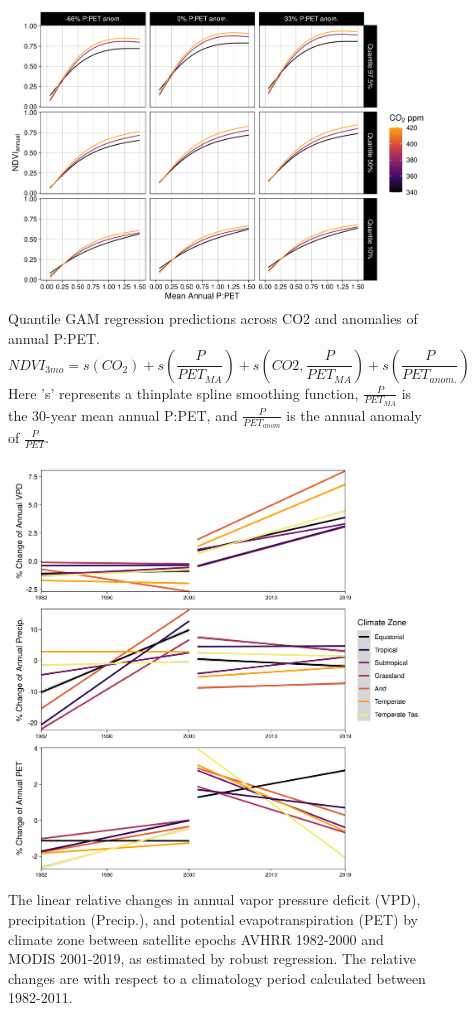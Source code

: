 \documentclass[gc, manuscript]{copernicus}
\begin{document}
\clearpage
\begin{figure}
\includegraphics[width=14cm]{../../figures/appendix-A/SM_Fig7_quantile_reg_ndvi_ppet_x_co2} \caption{Quantile GAM regression predictions across CO2 and anomalies of annual P:PET. $$NDVI_{3mo} = s(CO_{2})+s(\frac{P}{PET_{MA}})+s(CO2,\frac{P}{PET_{MA}})+s(\frac{P}{PET_{anom.}})$$ Here 's' represents a thinplate spline smoothing function, $\frac{P}{PET_{MA}}$ is the 30-year mean annual P:PET, and $\frac{P}{PET_{anom}}$ is the annual anomaly of $\frac{P}{PET}$.}\label{fig:FigA7}
\end{figure}
\clearpage

\clearpage
\begin{figure}
\includegraphics[width=14cm]{../../figures/appendix-A/SM_Fig8_zonal_vpd_precip_pet_trend_by_epoch} \caption{The linear relative changes in annual vapor pressure deficit (VPD), precipitation (Precip.), and potential evapotranspiration (PET) by climate zone between satellite epochs AVHRR 1982-2000 and MODIS 2001-2019, as estimated by robust regression. The relative changes are with respect to a climatology period calculated between 1982-2011.}\label{fig:FigA8}
\end{figure}
\clearpage
\end{document}
